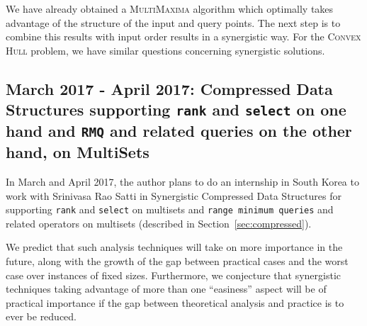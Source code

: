 We have already obtained a \textsc{MultiMaxima} algorithm which
optimally takes advantage of the structure of the input and query
points. The next step is to combine this results with input order
results in a synergistic way.
For the \textsc{Convex Hull} problem, we have similar questions
concerning synergistic solutions.

\subsection{March 2017 - April 2017: Compressed Data Structures
  supporting \texttt{rank} and \texttt{select} on one hand and
  \texttt{RMQ} and related queries on the other hand, on MultiSets}

In March and April 2017, the author plans to do an internship in South
Korea to work with Srinivasa Rao Satti in Synergistic Compressed Data
Structures for supporting \texttt{rank} and \texttt{select} on
multisets and \texttt{range minimum queries} and related operators on
multisets (described in Section~\ref{sec:compressed}).

We predict that such analysis techniques will take on more importance
in the future, along with the growth of the gap between practical
cases and the worst case over instances of fixed sizes. Furthermore,
we conjecture that synergistic techniques taking advantage of more
than one ``easiness'' aspect will be of practical importance if the
gap between theoretical analysis and practice is to ever be reduced.

\newpage

